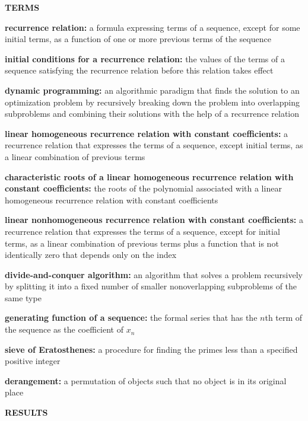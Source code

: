 \documentclass[11pt]{article}
\begin{document}
\begin{multicols}{2}

\begin{center}
    \textbf{TERMS}
\end{center}

\textbf{recurrence relation:} a formula expressing terms of a sequence, except for some initial terms, as a function of one or more previous terms of the sequence

\textbf{initial conditions for a recurrence relation:} the values of the terms of a sequence satisfying the recurrence relation before this relation takes effect

\textbf{dynamic programming:} an algorithmic paradigm that finds the solution to an optimization problem by recursively breaking down the problem into overlapping subproblems and combining their solutions with the help of a recurrence relation

\textbf{linear homogeneous recurrence relation with constant coefficients:} a recurrence relation that expresses the terms of a sequence, except initial terms, as a linear combination of previous terms

\textbf{characteristic roots of a linear homogeneous recurrence relation with constant coefficients:} the roots of the polynomial associated with a linear homogeneous recurrence relation with constant coefficients

\textbf{linear nonhomogeneous recurrence relation with constant coefficients:} a recurrence relation that expresses the terms of a sequence, except for initial terms, as a linear combination of previous terms plus a function that is not identically zero that depends only on the index

\textbf{divide-and-conquer algorithm:} an algorithm that solves a problem recursively by splitting it into a fixed number of smaller nonoverlapping subproblems of the same type

\textbf{generating function of a sequence:} the formal series that has the $n$th term of the sequence as the coefficient of $x_n$

\textbf{sieve of Eratosthenes:} a procedure for finding the primes less than a specified positive integer

\textbf{derangement:} a permutation of objects such that no object is in its original place

\begin{center}
\textbf{RESULTS}
\end{center}


\end{multicols}
\end{document}
